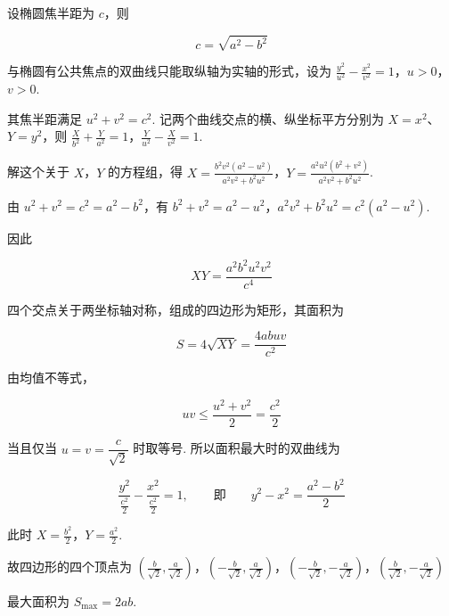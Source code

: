 \begin{solution}
设椭圆焦半距为 \(c\)，则

\[c=\sqrt{a^2-b^2}\]

与椭圆有公共焦点的双曲线只能取纵轴为实轴的形式，设为 \(\frac{y^2}{u^2}-\frac{x^2}{v^2}=1\)，\(u>0\)，\(v>0\).

其焦半距满足 \(u^2+v^2=c^2\). 记两个曲线交点的横、纵坐标平方分别为 \(X=x^2\)、\(Y=y^2\)，则 \(\frac{X}{b^2}+\frac{Y}{a^2}=1\)，\(\frac{Y}{u^2}-\frac{X}{v^2}=1\).

解这个关于 \(X\)，\(Y\) 的方程组，得 \(X=\frac{b^2v^2(a^2-u^2)}{a^2v^2+b^2u^2}\)，\(Y=\frac{a^2u^2(b^2+v^2)}{a^2v^2+b^2u^2}\).

由 \(u^2+v^2=c^2=a^2-b^2\)，有 \(b^2+v^2=a^2-u^2\)，\(a^2v^2+b^2u^2=c^2(a^2-u^2)\).

因此

\[XY=\frac{a^2b^2u^2v^2}{c^4}\]

四个交点关于两坐标轴对称，组成的四边形为矩形，其面积为

\[S=4\sqrt{XY}=\frac{4abuv}{c^2}\]

由均值不等式，

\[uv\leqslant\frac{u^2+v^2}{2}=\frac{c^2}{2}\]

当且仅当 \(u=v=\dfrac{c}{\sqrt2}\) 时取等号. 所以面积最大时的双曲线为

\[\frac{y^2}{\frac{c^2}{2}}-\frac{x^2}{\frac{c^2}{2}}=1,\qquad\text{即}\qquad y^2-x^2=\frac{a^2-b^2}{2}\]

此时 \(X=\frac{b^2}{2}\)，\(Y=\frac{a^2}{2}\).

故四边形的四个顶点为 \(\left(\frac{b}{\sqrt2},\frac{a}{\sqrt2}\right)\)，\(\left(-\frac{b}{\sqrt2},\frac{a}{\sqrt2}\right)\)，\(\left(-\frac{b}{\sqrt2},-\frac{a}{\sqrt2}\right)\)，\(\left(\frac{b}{\sqrt2},-\frac{a}{\sqrt2}\right)\)

最大面积为 \(S_{\max}=2ab\).
\end{solution}

